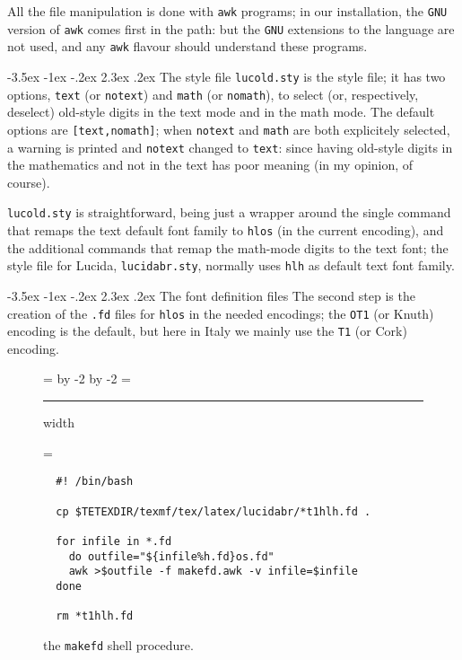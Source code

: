 \documentclass[a4paper]{article}
\makeatletter
\newenvironment{bigbox}
{\begingroup\boxfigwidth=\hsize%
  \advance\boxfigwidth by -2\fboxrule%
  \advance\boxfigwidth by -2\fboxsep%
  \setbox4=\vbox\bgroup\hsize\boxfigwidth%
  \hrule height0pt width\boxfigwidth\par\bigskip%
  \linewidth=\boxfigwidth%
}{\smallskip\egroup\fbox{\box4}\endgroup}
\renewcommand{\section}{\@startsection {section}{1}{\z@}%
  {-3.5ex \@plus -1ex \@minus -.2ex}%
  {2.3ex \@plus.2ex}%
  {\normalfont\Large\sffamily\bfseries}}
\makeatother
\begin{document}
All the file manipulation is done with \verb|awk| programs;
in our installation, the \verb|GNU| version of \verb|awk|
comes first in the path: but the \verb|GNU| extensions to
the language are not used, and any \verb|awk| flavour should
understand these programs.

\section{The style file}
\verb|lucold.sty| is the style file; it has two options,
\verb|text| (or \verb|notext|) and \verb|math| (or
\verb|nomath|), to select (or, respectively, deselect)
old-style digits in the text mode and in the math mode.
The default options are \verb|[text,nomath]|; when
\verb|notext| and \verb|math| are both explicitely selected,
a warning is printed and \verb|notext| changed to
\verb|text|: since having old-style digits in the
mathematics and not in the text has poor meaning (in my
opinion, of course).

\verb|lucold.sty| is straightforward, being just a wrapper
around the single command that remaps the text default font
family to \verb|hlos| (in the current encoding), and the
additional commands that remap the math-mode digits to the
text font; the style file for Lucida, \verb|lucidabr.sty|,
normally uses \verb|hlh| as default text font family.

\section{The font definition files}
The second step is the creation of the \verb|.fd| files for
\verb|hlos| in the needed encodings; the \verb|OT1| (or
Knuth) encoding is the default, but here in Italy we mainly
use the \verb|T1| (or Cork) encoding.

\begin{figure}[htbp]
  \begin{bigbox}
\begin{verbatim}
  #! /bin/bash

  cp $TETEXDIR/texmf/tex/latex/lucidabr/*t1hlh.fd .

  for infile in *.fd
    do outfile="${infile%h.fd}os.fd"
    awk >$outfile -f makefd.awk -v infile=$infile
  done

  rm *t1hlh.fd
\end{verbatim}
  \end{bigbox}
  \caption{the \texttt{makefd} shell procedure.}
  \label{fig:fd}
\end{figure}
\end{document}
